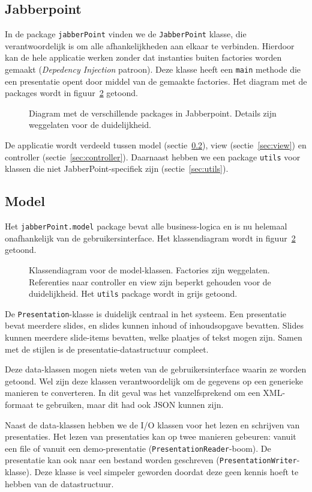 \documentclass[a4paper]{article}
\newcommand{\code}[1]{\lstinline[columns=fixed]{#1}}
\newcommand{\diagram}[3][1.3]{
	\begin{figure}[!htb]
	 \caption{#3}
	 \label{diagram:#2}
	 \makebox[\textwidth][c]{\texttt{[image: Diagrams/\#2.pdf]}}%
	\end{figure}
}
\begin{document}
	\subsection{Jabberpoint}
		In de package \code{jabberPoint} vinden we de \code{JabberPoint} klasse, die verantwoordelijk is om alle afhankelijkheden aan elkaar te verbinden.
		Hierdoor kan de hele applicatie werken zonder dat instanties buiten factories worden gemaakt (\textit{Depedency Injection} patroon).
		Deze klasse heeft een \code{main} methode die een presentatie opent door middel van de gemaakte factories.
		Het diagram met de packages wordt in figuur~\ref{diagram:model} getoond.

		\diagram{jabberPoint-packages}{
			Diagram met de verschillende packages in Jabberpoint.
			Details zijn weggelaten voor de duidelijkheid.
		}
		
		De applicatie wordt verdeeld tussen model (sectie~\ref{sec:model}), view (sectie~\ref{sec:view}) en controller (sectie~\ref{sec:controller}).
		Daarnaast hebben we een package \code{utils} voor klassen die niet JabberPoint-specifiek zijn (sectie~\ref{sec:utils}).

	\subsection{Model}\label{sec:model}
		Het \code{jabberPoint.model} package bevat alle business-logica en is nu helemaal onafhankelijk van de gebruikersinterface.
		Het klassendiagram wordt in figuur~\ref{diagram:model} getoond.

		\diagram{model}{
			Klassendiagram voor de model-klassen.
			Factories zijn weggelaten.
			Referenties naar controller en view zijn beperkt gehouden voor de duidelijkheid.
			Het \code{utils} package wordt in grijs getoond.
		}

		De \code{Presentation}-klasse is duidelijk centraal in het systeem.
		Een presentatie bevat meerdere slides, en slides kunnen inhoud of inhoudsopgave bevatten.
		Slides kunnen meerdere slide-items bevatten, welke plaatjes of tekst mogen zijn.
		Samen met de stijlen is de presentatie-datastructuur compleet.

		Deze data-klassen mogen niets weten van de gebruikersinterface waarin ze worden getoond.
		Wel zijn deze klassen verantwoordelijk om de gegevens op een generieke manieren te converteren.
		In dit geval was het vanzelfsprekend om een XML-formaat te gebruiken, maar dit had ook JSON kunnen zijn.

		Naast de data-klassen hebben we de I/O klassen voor het lezen en schrijven van presentaties.
		Het lezen van presentaties kan op twee manieren gebeuren: vanuit een file of vanuit een demo-presentatie (\code{PresentationReader}-boom).
		De presentatie kan ook naar een bestand worden geschreven (\code{PresentationWriter}-klasse).
		Deze klasse is veel simpeler geworden doordat deze geen kennis hoeft te hebben van de datastructuur.
\end{document}
